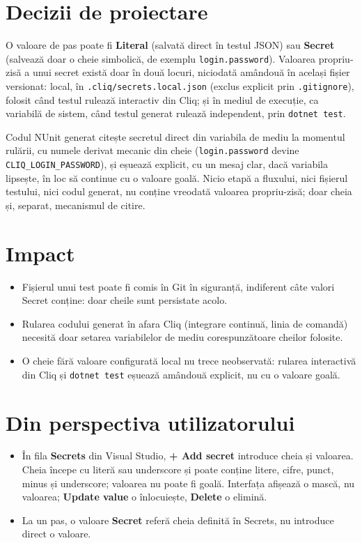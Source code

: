 \documentclass[12pt,a4paper]{report}
\newcommand{\UI}[1]{\textbf{#1}}
\newcommand{\File}[1]{\nolinkurl{#1}}
\begin{document}
\section{Decizii de proiectare}

O valoare de pas poate fi \UI{Literal} (salvată direct în testul JSON) sau \UI{Secret} (salvează doar o cheie simbolică, de exemplu \File{login.password}). Valoarea propriu-zisă a unui secret există doar în două locuri, niciodată amândouă în același fișier versionat: local, în \File{.cliq/secrets.local.json} (exclus explicit prin \File{.gitignore}), folosit când testul rulează interactiv din Cliq; și în mediul de execuție, ca variabilă de sistem, când testul generat rulează independent, prin \File{dotnet test}.

Codul NUnit generat citește secretul direct din variabila de mediu la momentul rulării, cu numele derivat mecanic din cheie (\File{login.password} devine \File{CLIQ\_LOGIN\_PASSWORD}), și eșuează explicit, cu un mesaj clar, dacă variabila lipsește, în loc să continue cu o valoare goală. Nicio etapă a fluxului, nici fișierul testului, nici codul generat, nu conține vreodată valoarea propriu-zisă; doar cheia și, separat, mecanismul de citire.

\section{Impact}

\begin{itemize}
  \item Fișierul unui test poate fi comis în Git în siguranță, indiferent câte valori Secret conține: doar cheile sunt persistate acolo.
  \item Rularea codului generat în afara Cliq (integrare continuă, linia de comandă) necesită doar setarea variabilelor de mediu corespunzătoare cheilor folosite.
  \item O cheie fără valoare configurată local nu trece neobservată: rularea interactivă din Cliq și \File{dotnet test} eșuează amândouă explicit, nu cu o valoare goală.
\end{itemize}

\section{Din perspectiva utilizatorului}

\begin{itemize}
  \item În fila \UI{Secrets} din Visual Studio, \UI{+ Add secret} introduce cheia și valoarea. Cheia începe cu literă sau underscore și poate conține litere, cifre, punct, minus și underscore; valoarea nu poate fi goală. Interfața afișează o mască, nu valoarea; \UI{Update value} o înlocuiește, \UI{Delete} o elimină.
  \item La un pas, o valoare \UI{Secret} referă cheia definită în Secrets, nu introduce direct o valoare.
\end{itemize}
\end{document}
